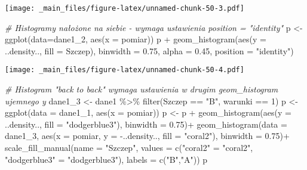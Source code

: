 \documentclass[
]{book}
\newenvironment{Shaded}{\begin{snugshade}}{\end{snugshade}}
\newcommand{\AttributeTok}[1]{\textcolor[rgb]{0.77,0.63,0.00}{#1}}
\newcommand{\CommentTok}[1]{\textcolor[rgb]{0.56,0.35,0.01}{\textit{#1}}}
\newcommand{\DecValTok}[1]{\textcolor[rgb]{0.00,0.00,0.81}{#1}}
\newcommand{\FloatTok}[1]{\textcolor[rgb]{0.00,0.00,0.81}{#1}}
\newcommand{\FunctionTok}[1]{\textcolor[rgb]{0.00,0.00,0.00}{#1}}
\newcommand{\NormalTok}[1]{#1}
\newcommand{\OtherTok}[1]{\textcolor[rgb]{0.56,0.35,0.01}{#1}}
\newcommand{\SpecialCharTok}[1]{\textcolor[rgb]{0.00,0.00,0.00}{#1}}
\newcommand{\StringTok}[1]{\textcolor[rgb]{0.31,0.60,0.02}{#1}}
\begin{document}
\texttt{[image: \_main\_files/figure-latex/unnamed-chunk-50-3.pdf]}

\begin{Shaded}
\begin{Highlighting}[]
\CommentTok{\# Histogramy nałożone na siebie {-} wymaga ustawienia position = "identity"}
\NormalTok{p }\OtherTok{\textless{}{-}} \FunctionTok{ggplot}\NormalTok{(}\AttributeTok{data=}\NormalTok{dane1\_2, }\FunctionTok{aes}\NormalTok{(}\AttributeTok{x =}\NormalTok{ pomiar))}
\NormalTok{p }\SpecialCharTok{+} \FunctionTok{geom\_histogram}\NormalTok{(}\FunctionTok{aes}\NormalTok{(}\AttributeTok{y =}\NormalTok{ ..density.., }\AttributeTok{fill =}\NormalTok{ Szczep), }\AttributeTok{binwidth =} \FloatTok{0.75}\NormalTok{, }\AttributeTok{alpha =} \FloatTok{0.45}\NormalTok{, }\AttributeTok{position =} \StringTok{"identity"}\NormalTok{)}
\end{Highlighting}
\end{Shaded}

\texttt{[image: \_main\_files/figure-latex/unnamed-chunk-50-4.pdf]}

\begin{Shaded}
\begin{Highlighting}[]
\CommentTok{\# Histogram "back to back" wymaga ustawienia w drugim geom\_histogram ujemnego y}
\NormalTok{dane1\_3 }\OtherTok{\textless{}{-}}\NormalTok{ dane1 }\SpecialCharTok{\%\textgreater{}\%} \FunctionTok{filter}\NormalTok{(Szczep }\SpecialCharTok{==} \StringTok{"B"}\NormalTok{, warunki }\SpecialCharTok{==} \DecValTok{1}\NormalTok{)}
\NormalTok{p }\OtherTok{\textless{}{-}} \FunctionTok{ggplot}\NormalTok{(}\AttributeTok{data =}\NormalTok{ dane1\_1, }\FunctionTok{aes}\NormalTok{(}\AttributeTok{x =}\NormalTok{ pomiar))}
\NormalTok{p }\OtherTok{\textless{}{-}}\NormalTok{ p }\SpecialCharTok{+} \FunctionTok{geom\_histogram}\NormalTok{(}\FunctionTok{aes}\NormalTok{(}\AttributeTok{y =}\NormalTok{ ..density.., }\AttributeTok{fill =} \StringTok{"dodgerblue3"}\NormalTok{), }\AttributeTok{binwidth =} \FloatTok{0.75}\NormalTok{)}\SpecialCharTok{+}
  \FunctionTok{geom\_histogram}\NormalTok{(}\AttributeTok{data =}\NormalTok{ dane1\_3, }\FunctionTok{aes}\NormalTok{(}\AttributeTok{x =}\NormalTok{ pomiar, }\AttributeTok{y =} \SpecialCharTok{{-}}\NormalTok{..density.., }\AttributeTok{fill =} \StringTok{"coral2"}\NormalTok{),}
                 \AttributeTok{binwidth =} \FloatTok{0.75}\NormalTok{)}\SpecialCharTok{+}
  \FunctionTok{scale\_fill\_manual}\NormalTok{(}\AttributeTok{name =} \StringTok{"Szczep"}\NormalTok{,}
                    \AttributeTok{values =} \FunctionTok{c}\NormalTok{(}\StringTok{"coral2"} \OtherTok{=} \StringTok{"coral2"}\NormalTok{, }\StringTok{"dodgerblue3"} \OtherTok{=} \StringTok{"dodgerblue3"}\NormalTok{), }
                    \AttributeTok{labels =} \FunctionTok{c}\NormalTok{(}\StringTok{"B"}\NormalTok{,}\StringTok{"A"}\NormalTok{))}
\NormalTok{p}
\end{Highlighting}
\end{Shaded}
\end{document}
